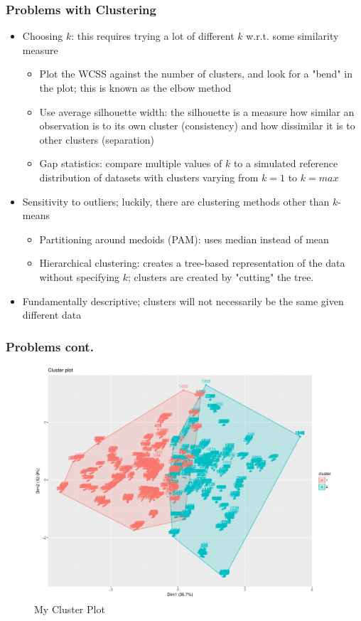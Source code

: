 \documentclass{beamer}
\begin{document}
\begin{frame}
	\frametitle{Problems with Clustering}
	\begin{itemize}
		\item Choosing $k$: this requires trying a lot of different $k$ w.r.t. some similarity measure
			\begin{itemize}
				\item Plot the WCSS against the number of clusters, and look for a "bend" in the plot; this is known as the elbow method
				\item Use average silhouette width: the silhouette is a measure how similar an observation is to its own cluster (consistency) and how dissimilar it is to other clusters (separation)
				\item Gap statistics: compare multiple values of $k$ to a simulated reference distribution of datasets with clusters varying from $k=1$ to $k=max$
			\end{itemize}
		\item Sensitivity to outliers; luckily, there are clustering methods other than $k$-means
			\begin{itemize}
				\item Partitioning around medoids (PAM): uses median instead of mean
				\item Hierarchical clustering: creates a tree-based representation of the data without specifying $k$; clusters are created by "cutting" the tree.  
			\end{itemize}
		\item Fundamentally descriptive; clusters will not necessarily be the same given different data
	\end{itemize}
\end{frame}

\begin{frame}
\frametitle{Problems cont.}

\begin{figure}
	\centering
	\includegraphics[width=0.7\linewidth]{clusterplot}
	\caption{My Cluster Plot}
	\label{fig:clusterplot}
\end{figure}

\end{frame}
\end{document}
